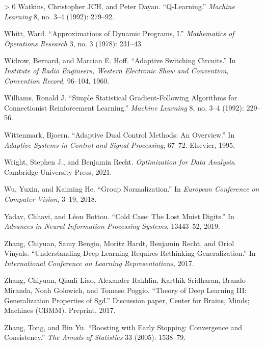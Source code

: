 \documentclass{tufte-book}
\newlength{\cslhangindent}
\newenvironment{CSLReferences}[3] %
 {%
  \setlength{\parindent}{0pt}
  \ifodd #1 \everypar{\setlength{\hangindent}{\cslhangindent}}\ignorespaces\fi
  \ifnum #2 > 0
  \setlength{\parskip}{#3\baselineskip}
  \fi
 }%
 {
 }
\newif\ifshowchapternumber
\begin{document}
\begin{CSLReferences}{1}{0}
\leavevmode\hypertarget{ref-watkins1992q}{}%
Watkins, Christopher JCH, and Peter Dayan. {``Q-Learning.''}
\emph{Machine Learning} 8, no. 3--4 (1992): 279--92.

\leavevmode\hypertarget{ref-Whitt78}{}%
Whitt, Ward. {``Approximations of Dynamic Programs, {I}.''}
\emph{Mathematics of Operations Research} 3, no. 3 (1978): 231--43.

\leavevmode\hypertarget{ref-WidrowHoffLMS}{}%
Widrow, Bernard, and Marcian E. Hoff. {``Adaptive Switching Circuits.''}
In \emph{Institute of Radio Engineers, Western Electronic Show and
Convention, Convention Record}, 96--104, 1960.

\leavevmode\hypertarget{ref-williams1992simple}{}%
Williams, Ronald J. {``Simple Statistical Gradient-Following Algorithms
for Connectionist Reinforcement Learning.''} \emph{Machine Learning} 8,
no. 3--4 (1992): 229--56.

\leavevmode\hypertarget{ref-wittenmark1995adaptive}{}%
Wittenmark, Bjoern. {``Adaptive Dual Control Methods: An Overview.''} In
\emph{Adaptive Systems in Control and Signal Processing}, 67--72.
Elsevier, 1995.

\leavevmode\hypertarget{ref-Wright2021}{}%
Wright, Stephen J., and Benjamin Recht. \emph{Optimization for Data
Analysis}. Cambridge University Press, 2021.

\leavevmode\hypertarget{ref-wu2018group}{}%
Wu, Yuxin, and Kaiming He. {``Group Normalization.''} In \emph{European
Conference on Computer Vision}, 3--19, 2018.

\leavevmode\hypertarget{ref-yadav2019cold}{}%
Yadav, Chhavi, and Léon Bottou. {``Cold Case: The Lost Mnist Digits.''}
In \emph{Advances in Neural Information Processing Systems}, 13443--52,
2019.

\leavevmode\hypertarget{ref-zhang2017understanding}{}%
Zhang, Chiyuan, Samy Bengio, Moritz Hardt, Benjamin Recht, and Oriol
Vinyals. {``Understanding Deep Learning Requires Rethinking
Generalization.''} In \emph{International Conference on Learning
Representations}, 2017.

\leavevmode\hypertarget{ref-zhang2017theory}{}%
Zhang, Chiyuan, Qianli Liao, Alexander Rakhlin, Karthik Sridharan,
Brando Miranda, Noah Golowich, and Tomaso Poggio. {``Theory of Deep
Learning {III}: Generalization Properties of Sgd.''} Discussion paper,
Center for Brains, Minds; Machines (CBMM). Preprint, 2017.

\leavevmode\hypertarget{ref-zhang2005boosting}{}%
Zhang, Tong, and Bin Yu. {``Boosting with Early Stopping: Convergence
and Consistency.''} \emph{The Annals of Statistics} 33 (2005): 1538--79.

\end{CSLReferences}

\backmatter

\showchapternumberfalse

\listoffigures
\listoftables

\printindex
\end{document}
